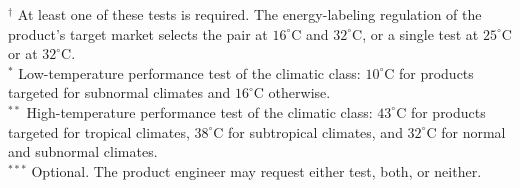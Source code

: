 \begin{table}[H]
\vspace{1mm}
\begin{minipage}{0.95\textwidth}
\footnotesize
$^{\dagger}$ At least one of these tests is required. The energy-labeling regulation of the product's target market selects the pair at \(16^\circ\mathrm{C}\) and \(32^\circ\mathrm{C}\), or a single test at \(25^\circ\mathrm{C}\) or at \(32^\circ\mathrm{C}\).\\
$^{*}$ Low-temperature performance test of the climatic class: \(10^\circ\mathrm{C}\) for products targeted for subnormal climates and \(16^\circ\mathrm{C}\) otherwise.\\
$^{**}$ High-temperature performance test of the climatic class: \(43^\circ\mathrm{C}\) for products targeted for tropical climates, \(38^\circ\mathrm{C}\) for subtropical climates, and \(32^\circ\mathrm{C}\) for normal and subnormal climates.\\
$^{***}$ Optional. The product engineer may request either test, both, or neither.
\end{minipage}
\end{table}




